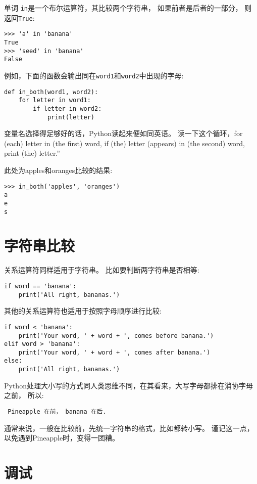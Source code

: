\documentclass[10pt]{book}
\begin{document}
单词 {\tt in}是一个布尔运算符，其比较两个字符串，
如果前者是后者的一部分，
则返回{\tt True}:

\begin{verbatim}
>>> 'a' in 'banana'
True
>>> 'seed' in 'banana'
False
\end{verbatim}
%
例如，下面的函数会输出同在{\tt word1}和{\tt word2}中出现的字母:

\begin{verbatim}
def in_both(word1, word2):
    for letter in word1:
        if letter in word2:
            print(letter)
\end{verbatim}
%

变量名选择得足够好的话，Python读起来便如同英语。
读一下这个循环，for (each) letter in (the first) word, if (the) letter 
(appears) in (the second) word, print (the) letter.''

此处为apples和oranges比较的结果:

\begin{verbatim}
>>> in_both('apples', 'oranges')
a
e
s
\end{verbatim}
%

\section{字符串比较}

关系运算符同样适用于字符串。
比如要判断两字符串是否相等:

\begin{verbatim}
if word == 'banana':
    print('All right, bananas.')
\end{verbatim}
%

其他的关系运算符也适用于按照字母顺序进行比较:

\begin{verbatim}
if word < 'banana':
    print('Your word, ' + word + ', comes before banana.')
elif word > 'banana':
    print('Your word, ' + word + ', comes after banana.')
else:
    print('All right, bananas.')
\end{verbatim}
%
Python处理大小写的方式同人类思维不同，在其看来，大写字母都排在消协字母之前，
所以:

\begin{verbatim}
 Pineapple 在前， banana 在后.
\end{verbatim}
%
通常来说，一般在比较前，先统一字符串的格式，比如都转小写。
谨记这一点，以免遇到Pineapple时，变得一团糟。


\section{调试}
\end{document}
